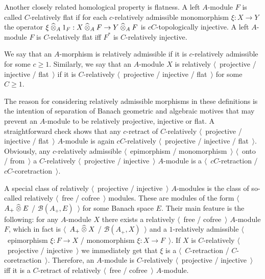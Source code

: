Another closely related homological property is flatness. A
left $A$-module $F$ is called $C$-relatively flat if for each
$c$-relatively admissible monomorphism $\xi:X\to Y$ the operator 
$\xi\mathbin{\widehat{\otimes}}_{A} 1_F:X\mathbin{\widehat{\otimes}}_{A} F\to Y\mathbin{\widehat{\otimes}}_{A} F$ is
$cC$-topologically injective. A left $A$-module $F$ is $C$-relatively flat iff
$F^*$ is $C$-relatively injective. 

We say that an $A$-morphism is relatively admissible if it is $c$-relatively 
admissible for some $c\geq 1$. Similarly, we say that an $A$-module $X$ is 
relatively $\langle$~projective / injective / flat~$\rangle$ if it is  
$C$-relatively $\langle$~projective / injective / flat~$\rangle$ for 
some $C\geq 1$.

The reason for considering relatively admissible morphisms in these definitions
is the intention of separation of Banach geometric and algebraic motives that 
may prevent an $A$-module to be relatively projective, injective or flat. 
A straightforward check shows that any $c$-retract of 
$C$-relatively $\langle$~projective / injective / flat~$\rangle$ $A$-module is 
again $cC$-relatively $\langle$~projective / injective / flat~$\rangle$. 
Obviously, any $c$-relatively admissible $\langle$~epimorphism
/ monomorphism~$\rangle$ $\langle$~onto / from~$\rangle$ a $C$-relatively
$\langle$~projective / injective~$\rangle$ $A$-module is a 
$\langle$~$cC$-retraction / $cC$-coretraction~$\rangle$.

A special class of relatively $\langle$~projective / injective~$\rangle$
$A$-modules is the class of so-called 
relatively $\langle$~free / cofree~$\rangle$ modules. 
These are modules of the form $\langle$~$A_+\mathbin{\widehat{\otimes}} E$ /
$\mathcal{B}(A_+,E)$~$\rangle$ for some Banach space $E$. Their main feature is
the following: for any $A$-module $X$ there exists a relatively $\langle$~free /
cofree~$\rangle$ $A$-module $F$, which in fact is $\langle$~$A_+\mathbin{\widehat{\otimes}} X$ /
$\mathcal{B}(A_+,X)$~$\rangle$ and a $1$-relatively admissible 
$\langle$~epimorphism $\xi:F\to X$ / monomorphism $\xi:X\to F$~$\rangle$. 
If $X$ is $C$-relatively
$\langle$~projective / injective~$\rangle$ we immediately get that $\xi$ is a
$\langle$~$C$-retraction / $C$-coretraction~$\rangle$. Therefore, an $A$-module 
is $C$-relatively $\langle$~projective / injective~$\rangle$ iff it is 
a $C$-retract of relatively $\langle$~free / cofree~$\rangle$ $A$-module. 

